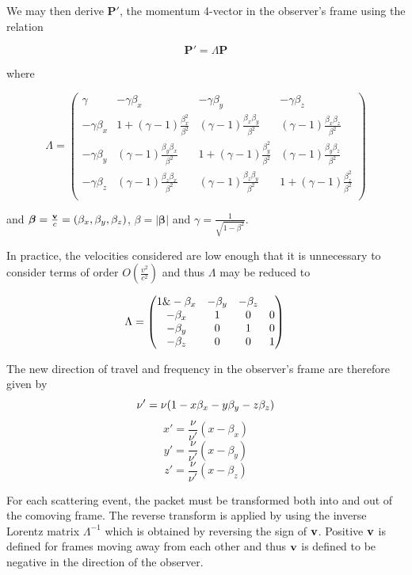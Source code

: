 \documentclass[useAMS,usenatbib,usegraphicx]{mnras}
\begin{document}
\noindent We may then derive $\mathbf{P'}$, the momentum 4-vector in the 
observer's frame using the relation

\begin{equation}
	\mathbf{P'}=\Lambda \mathbf{P}	
\end{equation}

\noindent where 

\[
	{\Lambda}=
	 \begin{pmatrix} 
	  \gamma & -\gamma \beta_x & -\gamma \beta_y & -\gamma \beta_z \\
	 -\gamma \beta_x & 1+(\gamma-1)\frac{\beta_x^2}{\beta^2} & (\gamma-1)\frac{\beta_x \beta_y}{\beta^2} & (\gamma-1)\frac{\beta_x \beta_z}{\beta^2} \\
	 -\gamma \beta_y  & (\gamma-1)\frac{\beta_y \beta_x}{\beta^2} & 1+(\gamma-1)\frac{\beta_y^2}{\beta^2} & (\gamma-1)\frac{\beta_y \beta_z}{\beta^2} \\
	 -\gamma \beta_z & (\gamma-1)\frac{\beta_z \beta_x}{\beta^2} & (\gamma-1)\frac{\beta_z \beta_y}{\beta^2} & 1+(\gamma-1)\frac{\beta_z^2}{\beta^2} \\
	 \end{pmatrix}
\]

 \noindent and $\boldsymbol{\beta}=\frac{{\bf{v}}}{c}=(\beta_x,\beta_y,\beta_z)$,   $\beta=\lvert \boldsymbol{\beta} \rvert$ and $\gamma = \frac{1}{\sqrt{1-\beta^2}}$.


In practice, the velocities considered are low enough that it is 
unnecessary to consider terms of order $O(\frac{v^2}{c^2})$ and thus 
${\Lambda}$ may be reduced to

\begin{equation}
	{\Lambda}=
	 \begin{pmatrix} 
	 1 \& - \beta_x & - \beta_y & - \beta_z \\
	- \beta_x & 1 & 0 & 0 \\
	- \beta_y  & 0 & 1 & 0\\
	- \beta_z & 0 & 0 & 1 \\
	 \end{pmatrix}
	 \\
\end{equation}

\noindent The new direction of travel and frequency in the observer's 
frame are therefore given by  
\begin{equation}
\nu'=\nu(1-x\beta_x-y\beta_y-z\beta_z) \\
\end{equation}
\[
x'=\frac{\nu}{\nu'}(x-\beta_x) 
\]
\[
y'=\frac{\nu}{\nu'}(x-\beta_y) 
\]
\[
z'=\frac{\nu}{\nu'}(x-\beta_z) 
\]

For each scattering event, the packet must be transformed both into and 
out of the comoving frame. The reverse transform is applied by using the 
inverse Lorentz matrix $\Lambda^{-1}$ which is obtained by reversing the 
sign of $\bf{v}$.  Positive $\bf{v}$ is defined for frames moving away 
from each other and thus $\bf{v}$ is defined to be negative in the 
direction of the observer.

\bsp

\label{lastpage}
\end{document}

